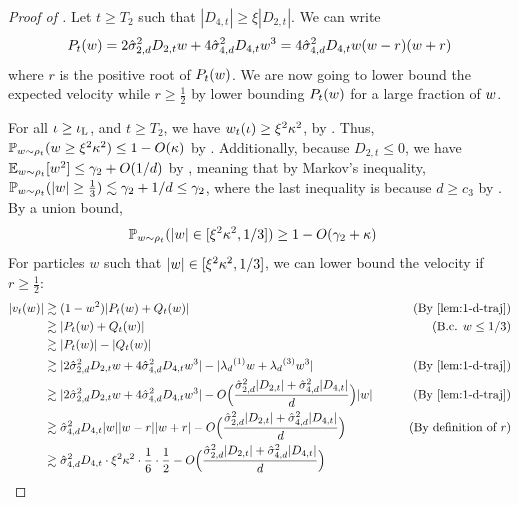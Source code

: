 \begin{proof}[Proof of ]
Let $t \geq T_2$ such that $|D_{4, t}| \geq \xi |D_{2, t}|$. We can write 
\begin{align}
P_t(w) = 2 \hat{\sigma}_{2, d}^2 D_{2, t} w + 4 \hat{\sigma}_{4, d}^2 D_{4, t} w^3 = 4 \hat{\sigma}_{4, d}^2 D_{4, t} w (w - r) (w + r)
\end{align}
where $r$ is the positive root of $P_t(w)$. We are now going to lower bound the expected velocity while $r \geq \frac{1}{2}$ by lower bounding $P_t(w)$ for a large fraction of $w$.

For all $\iota \geq \iota_{\textup{L}}$, and $t \geq T_2$, we have $w_t(\iota) \geq \xi^2 \kappa^2$, by . Thus, $\mathbb{P}_{w \sim \rho_t} (w \geq \xi^2 \kappa^2) \leq 1 - O(\kappa)$ by . Additionally, because $D_{2, t} \leq 0$, we have $\operatorname*{\mathbb{E}}_{w \sim \rho_t}[w^2] \leq \gamma_2 + O(1/d)$ by , meaning that by Markov's inequality, $\mathbb{P}_{w \sim \rho_t}(|w| \geq \frac{1}{3}) \lesssim \gamma_2 + 1/d \leq \gamma_2$, where the last inequality is because $d \geq c_3$ by . By a union bound,
\begin{align} \label{eq:prob_lower_bound_large_root}
\mathbb{P}_{w \sim \rho_t} (|w| \in [\xi^2 \kappa^2, 1/3])
& \geq 1 - O(\gamma_2 + \kappa)
\end{align}
For particles $w$ such that $|w| \in [\xi^2 \kappa^2, 1/3]$, we can lower bound the velocity if $r \geq \frac{1}{2}$:
\begin{align}
|\vel_t(\w)|
& \gtrsim (1 - \w^2)|P_t(\w) + Q_t(\w)|
& \tag{By \Cref{lem:1-d-traj}} \\
& \gtrsim |P_t(\w) + Q_t(\w)| 
& \tag{B.c. $w \leq 1/3$} \\
& \gtrsim |P_t(\w)| - |Q_t(\w)| \\
& \gtrsim |2 \sigmaCoeffTwo^2 D_{2, t} \w + 4 \sigmaCoeffFour^2 D_{4, t} \w^3| - |\lambdaD^{(1)} \w + \lambdaD^{(3)} \w^3|
& \tag{By \Cref{lem:1-d-traj}} \\
& \gtrsim |2 \sigmaCoeffTwo^2 D_{2, t} \w + 4 \sigmaCoeffFour^2 D_{4, t} \w^3| - O\Big(\frac{\sigmaCoeffTwo^2 |D_{2, t}| + \sigmaCoeffFour^2 |D_{4, t}|}{d}\Big) |\w| 
& \tag{By \Cref{lem:1-d-traj}} \\
& \gtrsim \sigmaCoeffFour^2 D_{4, t} |\w| |\w - r| |\w + r| - O\Big(\frac{\sigmaCoeffTwo^2 |D_{2, t}| + \sigmaCoeffFour^2 |D_{4, t}|}{d}\Big) 
& \tag{By definition of $r$} \\
& \gtrsim \sigmaCoeffFour^2 D_{4, t} \cdot \xi^2 \kappa^2 \cdot \frac{1}{6} \cdot \frac{1}{2} - O\Big(\frac{\sigmaCoeffTwo^2 |D_{2, t}| + \sigmaCoeffFour^2 |D_{4, t}|}{d}\Big) 

\end{align}
\end{proof}
